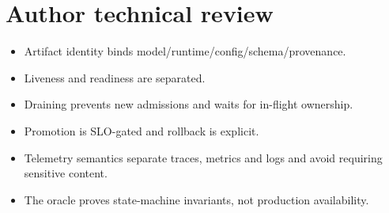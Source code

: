 \chapter*{Author technical review}
\begin{itemize}
\item Artifact identity binds model/runtime/config/schema/provenance.
\item Liveness and readiness are separated.
\item Draining prevents new admissions and waits for in-flight ownership.
\item Promotion is SLO-gated and rollback is explicit.
\item Telemetry semantics separate traces, metrics and logs and avoid requiring sensitive content.
\item The oracle proves state-machine invariants, not production availability.
\end{itemize}
